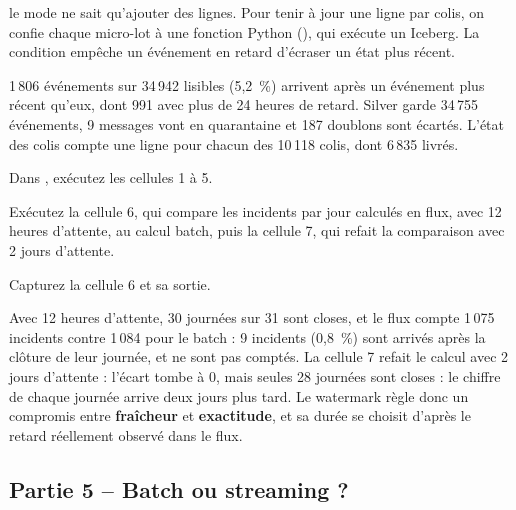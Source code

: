 \begin{notion}
le mode  ne sait qu'ajouter des
lignes. Pour tenir à jour une ligne par colis, on confie chaque micro-lot à une fonction Python
(), qui exécute un  Iceberg. La condition
 empêche un événement en retard d'écraser un état plus récent.
\end{notion}

\begin{resultat}
1\,806 événements sur 34\,942 lisibles (5,2~\%) arrivent après un événement plus récent qu'eux, dont
991 avec plus de 24 heures de retard. Silver garde 34\,755 événements, 9 messages vont en quarantaine
et 187 doublons sont écartés. L'état des colis compte une ligne pour chacun des 10\,118 colis,
dont 6\,835 livrés.
\end{resultat}

\begin{obtenir}
  \item Dans , exécutez les cellules 1 à 5.
  \item Exécutez la cellule 6, qui compare les incidents par jour calculés en flux, avec 12 heures d'attente, au calcul batch, puis la cellule 7, qui refait la comparaison avec 2 jours d'attente.
  \item Capturez la cellule 6 et sa sortie.
\end{obtenir}
\begin{lecture}
Avec 12 heures d'attente, 30 journées sur 31 sont closes, et le flux compte 1\,075 incidents contre
1\,084 pour le batch : 9 incidents (0,8~\%) sont arrivés après la clôture de leur journée, et ne sont
pas comptés. La cellule 7 refait le calcul avec 2 jours d'attente : l'écart tombe à 0, mais seules 28 journées sont closes : le
chiffre de chaque journée arrive deux jours plus tard. Le watermark règle donc un compromis entre
\textbf{fraîcheur} et \textbf{exactitude}, et sa durée se choisit d'après le retard réellement
observé dans le flux.
\end{lecture}


\subsection*{Partie 5 -- Batch ou streaming ? \hfill {}}


